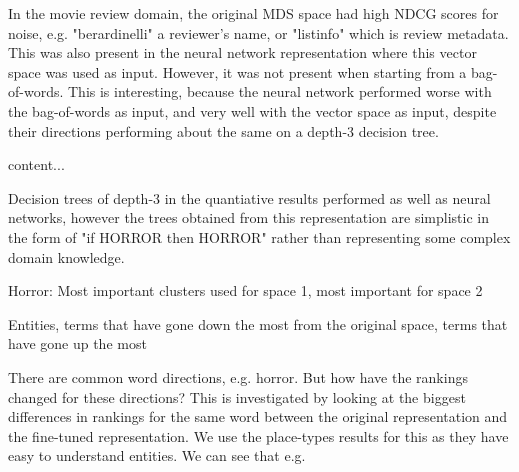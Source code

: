 In the movie review domain, the original MDS space had high NDCG scores for noise, e.g. "berardinelli" a reviewer's name, or "listinfo" which is review metadata. This was also present in the neural network representation where this vector space was used as input. However, it was not present when starting from a bag-of-words. This is interesting, because the neural network performed worse with the bag-of-words as input, and very well with the vector space as input, despite their directions performing about the same on a depth-3 decision tree.


\begin{table}[]\label{difference how top directions in original rep have changed}
	content...
\end{table}
 


Decision trees of depth-3 in the quantiative results performed as well as neural networks, however the trees obtained from this representation are simplistic in the form of "if HORROR then HORROR" rather than representing some complex domain knowledge.




\begin{table}[]\label{ch5:clustersusedintrees}
	Horror: Most important clusters used for space 1, most important for space 2
\end{table}




\begin{table}[]\label{Biggest difference in entities (entities that have gone down/gone up the most) for the same directions }
	Entities, terms that have gone down the most from the original space, terms that have gone up the most
\end{table}


There are common word directions, e.g. horror. But how have the rankings changed for these directions? This is investigated by looking at the biggest differences in rankings for the same word between the original representation and the fine-tuned representation. We use the place-types results for this as they have easy to understand entities. We can see that e.g.

